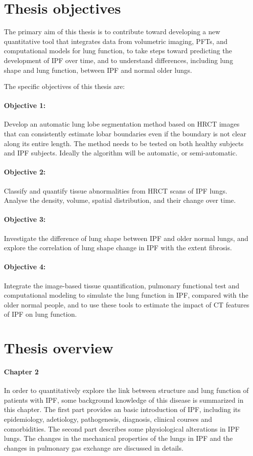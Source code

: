 \section{Thesis objectives} \label{ThesisObjective}
The primary aim of this thesis is to contribute toward developing a new quantitative tool that integrates data from volumetric imaging, PFTs, and computational models for lung function, to take steps toward predicting the development of IPF over time, and to understand differences, including lung shape and lung function, between IPF and normal older lungs. 

The specific objectives of this thesis are:

\paragraph{Objective 1:} Develop an automatic lung lobe segmentation method based on HRCT images that can consistently estimate lobar boundaries even if the boundary is not clear along its entire length. The method needs to be tested on both healthy subjects and IPF subjects. Ideally the algorithm will be automatic, or semi-automatic.
\paragraph{Objective 2:} Classify and quantify tissue abnormalities from HRCT scans of IPF lungs. Analyse the density, volume, spatial distribution, and their change over time.
\paragraph{Objective 3:} Investigate the difference of lung shape between IPF and older normal lungs, and explore the correlation of lung shape change in IPF with the extent fibrosis.
\paragraph{Objective 4:} Integrate the image-based tissue quantification, pulmonary functional test and computational modeling to simulate the lung function in IPF, compared with the older normal people, and to use these tools to estimate the impact of CT features of IPF on lung function.

\section{Thesis overview}
\paragraph{Chapter 2} In order to quantitatively explore the link between structure and lung function of patients with IPF, some background knowledge of this disease is summarized in this chapter. The first part provides an basic introduction of IPF, including its epidemiology, adetiology, pathogenesis, diagnosis, clinical courses and comorbidities. The second part describes some physiological alterations in IPF lungs. The changes in the mechanical properties of the lungs in IPF and the changes in pulmonary gas exchange are discussed in details.
